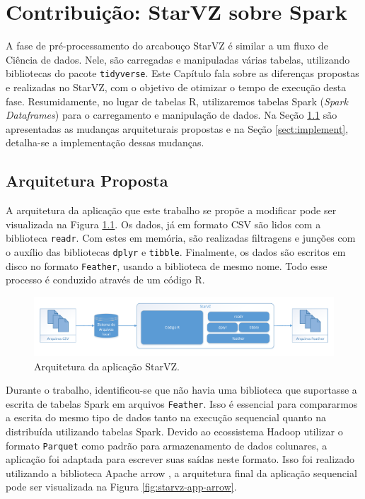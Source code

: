 \chapter{Contribuição: StarVZ sobre Spark} \label{ch:contribution}

A fase de pré-processamento do arcabouço StarVZ é similar a um fluxo de Ciência 
de dados. Nele, são carregadas e manipuladas várias tabelas, utilizando 
bibliotecas do pacote \texttt{tidyverse}. Este Capítulo fala sobre as diferenças 
propostas e realizadas no StarVZ, com o objetivo de otimizar o tempo de 
execução desta fase. Resumidamente, no lugar de tabelas R, utilizaremos tabelas
Spark (\emph{Spark Dataframes}) para o carregamento e manipulação de dados.
Na Seção \ref{sect:arch} são apresentadas as mudanças 
arquiteturais propostas e na Seção \ref{sect:implement}, detalha-se a 
implementação dessas mudanças.

\section{Arquitetura Proposta} \label{sect:arch}

A arquitetura da aplicação que este trabalho se propõe a modificar pode ser visualizada na Figura \ref{fig:starvz-app}.
Os dados, já em formato CSV são lidos com a biblioteca \texttt{readr}. Com estes em memória, são realizadas filtragens e junções com
o auxílio das bibliotecas \texttt{dplyr} e \texttt{tibble}. Finalmente, os dados são escritos em disco no formato \texttt{Feather}, 
usando a biblioteca de mesmo nome. Todo esse processo é conduzido através de um código R.

\begin{figure}[ht]
 \centerline{\includegraphics[width=1\textwidth]{./img/starvz-arch.pdf}}
 \caption{Arquitetura da aplicação StarVZ.}
 \label{fig:starvz-app}
\end{figure}

Durante o trabalho, identificou-se que não havia uma biblioteca que suportasse a escrita de tabelas Spark em arquivos \texttt{Feather}.
Isso é essencial para compararmos a escrita do mesmo tipo de dados tanto na execução sequencial quanto na distribuída utilizando tabelas Spark.
Devido ao ecossistema Hadoop utilizar o formato \texttt{Parquet} \cite{} como padrão para armazenamento de dados colunares, a aplicação 
foi adaptada para escrever suas saídas neste formato. Isso foi realizado utilizando a biblioteca Apache arrow \cite{}, a arquitetura final da aplicação sequencial pode ser visualizada na Figura \ref{fig:starvz-app-arrow}. 

